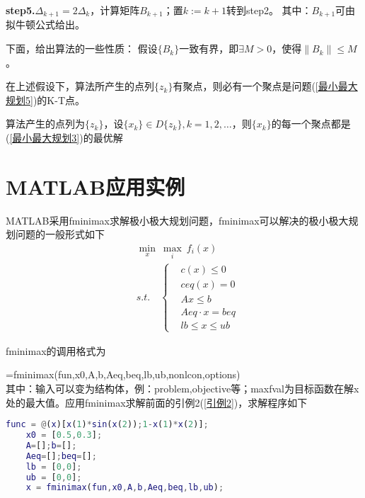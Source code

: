     \textbf{step5.}${\Delta}_{k+1}=2{\Delta}_k$，计算矩阵$B_{k+1}$；置$k:=k+1$转到step2。
    其中：$B_{k+1}$可由拟牛顿公式给出。
    \par
    下面，给出算法的一些性质：
    假设$\{B_k\}$一致有界，即$\exists M>0$，使得$\|B_k\| \leqslant M$。
    \begin{theorem}
    在上述假设下，算法所产生的点列$\{z_k\}$有聚点，则必有一个聚点是问题(\ref{最小最大规划5})的K-T点。
    \end{theorem}
    \begin{corollary}
    算法产生的点列为$\{z_k\}$，设$\{x_k\} \in D\{z_k\},k=1,2,\ldots$，则$\{x_k\}$的每一个聚点都是(\ref{最小最大规划3})的最优解
    \end{corollary}
\section{MATLAB应用实例}
    \par
    MATLAB采用fminimax求解极小极大规划问题，fminimax可以解决的极小极大规划问题的一般形式如下
    \begin{align*}
    &\mathop{\min}\limits_{x}\  \mathop{\max}\limits_{i}\ f_i(x)\\
    &s.t.\quad \left\{
    \begin{aligned}
    &c(x)\leqslant 0\\
    &ceq(x)=0\\
    &Ax\leqslant b\\
    &Aeq\cdot x=beq\\
    &lb\leqslant x\leqslant ub
    \end{aligned}
    \right.
    \end{align*}
    \par
    fminimax的调用格式为
    \par
    [x,fval,maxfval,exitflag,output,lambda]=fminimax(fun,x0,A,b,Aeq,beq,lb,ub,nonlcon,options)\\
    其中：输入可以变为结构体，例：problem,objective等；maxfval为目标函数在解x处的最大值。应用fminimax求解前面的引例2(\ref{引例2})，求解程序如下
    \lstset{flexiblecolumns}
    \begin{lstlisting}[language=Matlab]
    func = @(x)[x(1)*sin(x(2));1-x(1)*x(2)];
    x0 = [0.5,0.3];
    A=[];b=[];
    Aeq=[];beq=[];
    lb = [0,0];
    ub = [0,0];
    x = fminimax(fun,x0,A,b,Aeq,beq,lb,ub);
    \end{lstlisting}
% 
